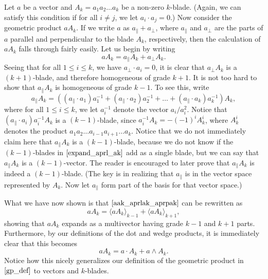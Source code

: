 \documentclass{article}
\newcommand{\prl}{\parallel}
\newcommand{\prp}{\perp}
\begin{document}
Let $a$ be a vector and $A_k=a_1a_2\dots a_k$ be a non-zero $k$-blade.
(Again, we can satisfy this condition if for all $i\neq j$, we let $a_i\cdot a_j=0$.)
Now consider the geometric product $aA_k$.  If we write $a$ as $a_{\prl}+a_{\prp}$,
where $a_{\prl}$ and $a_{\prp}$ are the parts of $a$ parallel and perpendicular
to the blade $A_k$, respectively, then the calculation of $aA_k$ falls through fairly easily.
Let us begin by writing
\begin{equation}\label{aak_aprlak_aprpak}
aA_k = a_{\prl}A_k + a_{\prp}A_k.
\end{equation}
Seeing that for all $1\leq i\leq k$, we have $a_{\prp}\cdot a_i=0$,
it is clear that $a_{\prp}A_k$ is a $(k+1)$-blade, and therefore
homogeneous of grade $k+1$.
It is not too hard to show that $a_{\prl}A_k$ is homogeneous of
grade $k-1$.  To see this, write
\begin{equation}\label{expand_aprl_ak}
a_{\prl}A_k = ((a_{\prl}\cdot a_1)a_1^{-1}+(a_{\prl}\cdot a_2)a_2^{-1}+\dots+(a_{\prl}\cdot a_k)a_k^{-1})A_k,
\end{equation}
where for all $1\leq i\leq k$, we let $a_i^{-1}$ denote the vector $a_i/a_i^2$.
Notice that $(a_{\prl}\cdot a_i)a_i^{-1}A_k$ is
a $(k-1)$-blade, since $a_i^{-1}A_k=-(-1)^iA_k^i$, where
$A_k^i$ denotes the product $a_1a_2\dots a_{i-1}a_{i+1}\dots a_k$.
Notice that we do not immediately claim here that $a_{\prl}A_k$
is a $(k-1)$-blade, because we do not know if the $(k-1)$-blades
in $\eqref{expand_aprl_ak}$ add as a single blade, but we can
say that $a_{\prl}A_k$ is a $(k-1)$-vector.  The reader is encouraged
to later prove that $a_{\prl}A_k$ is indeed a $(k-1)$-blade.  (The key is
in realizing that $a_{\prl}$ is in the vector space represented by $A_k$.
Now let $a_{\prl}$ form part of the basis for that vector space.)

What we have now shown is that $\eqref{aak_aprlak_aprpak}$ can
be rewritten as
\begin{equation*}
aA_k = \langle aA_k\rangle_{k-1} + \langle aA_k\rangle_{k+1},
\end{equation*}
showing that $aA_k$ expands as a multivector having grade
$k-1$ and $k+1$ parts.  Furthermore, by our definitions of
the dot and wedge products, it is immediately clear that
this becomes
\begin{equation*}
aA_k = a\cdot A_k + a\wedge A_k.
\end{equation*}
Notice how this nicely generalizes our definition of the
geometric product in $\eqref{gp_def}$ to vectors and $k$-blades.
\end{document}

